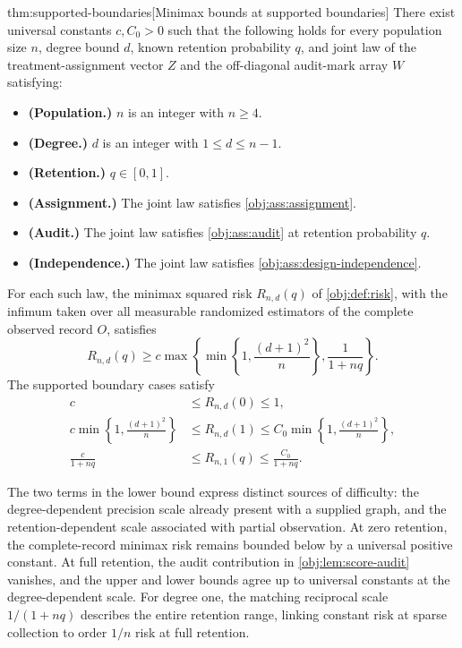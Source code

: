 \documentclass[11pt]{article}
\begin{document}
\begin{theoremv}{thm:supported-boundaries}[Minimax bounds at supported boundaries]
There exist universal constants \(c,C_0>0\) such that the following holds for every population size \(n\), degree bound \(d\), known retention probability \(q\), and joint law of the treatment-assignment vector \(Z\) and the off-diagonal audit-mark array \(W\) satisfying:
\begin{itemize}
\item \textbf{(Population.)} \(n\) is an integer with \(n\ge4\).
\item \textbf{(Degree.)} \(d\) is an integer with \(1\le d\le n-1\).
\item \textbf{(Retention.)} \(q\in[0,1]\).
\item \textbf{(Assignment.)} The joint law satisfies \cref{obj:ass:assignment}.
\item \textbf{(Audit.)} The joint law satisfies \cref{obj:ass:audit} at retention probability \(q\).
\item \textbf{(Independence.)} The joint law satisfies \cref{obj:ass:design-independence}.
\end{itemize}
For each such law, the minimax squared risk \(R_{n,d}(q)\) of \cref{obj:def:risk}, with the infimum taken over all measurable randomized estimators of the complete observed record \(O\), satisfies
\[
R_{n,d}(q)\ge
c\max\left\{
\min\left\{1,\frac{(d+1)^2}{n}\right\},
\frac{1}{1+nq}
\right\}.
\]
The supported boundary cases satisfy
\[
\begin{aligned}
c&\le R_{n,d}(0)\le1,\\
c\min\left\{1,\frac{(d+1)^2}{n}\right\}
&\le R_{n,d}(1)
\le C_0\min\left\{1,\frac{(d+1)^2}{n}\right\},\\
\frac{c}{1+nq}
&\le R_{n,1}(q)\le\frac{C_0}{1+nq}.
\end{aligned}
\]
\end{theoremv}

The two terms in the lower bound express distinct sources of difficulty: the degree-dependent precision scale already present with a supplied graph, and the retention-dependent scale associated with partial observation. At zero retention, the complete-record minimax risk remains bounded below by a universal positive constant. At full retention, the audit contribution in \cref{obj:lem:score-audit} vanishes, and the upper and lower bounds agree up to universal constants at the degree-dependent scale. For degree one, the matching reciprocal scale \(1/(1+nq)\) describes the entire retention range, linking constant risk at sparse collection to order \(1/n\) risk at full retention.
\end{document}
